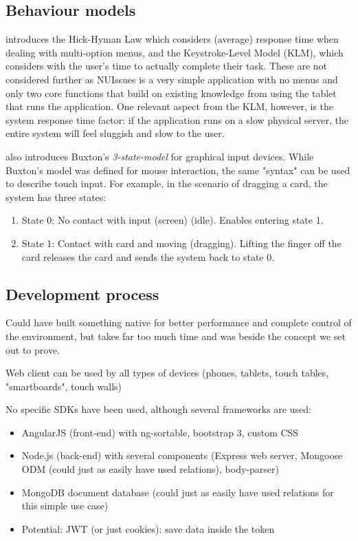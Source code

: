 \subsection{Behaviour models}

\textcite{mackenzie:motor-behaviour-models-for-human-computer-interaction:2003} introduces the Hick-Hyman Law which considers (average) response time when dealing with multi-option menus, and the Keystroke-Level Model (KLM), which considers with the user's time to actually complete their task. These are not considered further as NUIssues is a very simple application with no menus and only two core functions that build on existing knowledge from using the tablet that runs the application. One relevant aspect from the KLM, however, is the system response time factor: if the application runs on a slow physical server, the entire system will feel sluggish and slow to the user. 

\textcite[4]{mackenzie:motor-behaviour-models-for-human-computer-interaction:2003} also introduces Buxton's \textit{3-state-model} for graphical input devices. While Buxton's model was defined for mouse interaction, the same "syntax" can be used to describe touch input. For example, in the scenario of dragging a card, the system has three states:

\begin{enumerate}
  \item State 0: No contact with input (screen) (idle). Enables entering state 1.
  \item State 1: Contact with card and moving (dragging). Lifting the finger off the card releases the card and sends the system back to state 0.
\end{enumerate}

\subsection{Development process}

Could have built something native for better performance and complete control of the environment, but takes far too much time and was beside the concept we set out to prove.

Web client can be used by all types of devices (phones, tablets, touch tables, "smartboards", touch walls)

No specific SDKs have been used, although several frameworks are used:
\begin{itemize}
  \item AngularJS (front-end) with ng-sortable, bootstrap 3, custom CSS
  \item Node.js (back-end) with several components (Express web server, Mongoose ODM (could just as easily have used relations), body-parser)
  \item MongoDB document database (could just as easily have used relations for this simple use case)
  \item Potential: JWT (or just cookies): save data inside the token
\end{itemize}




